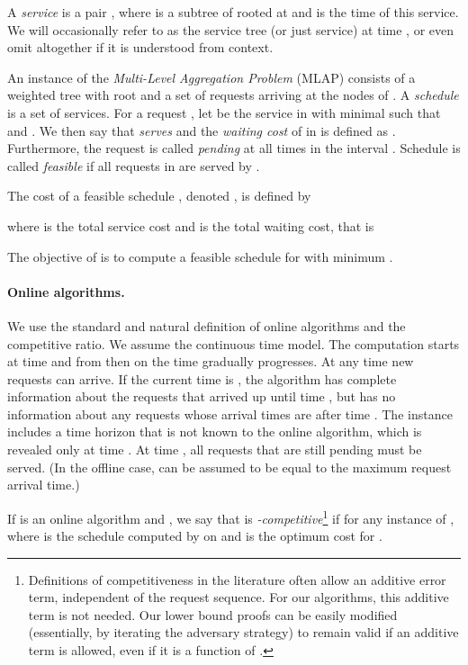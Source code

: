 \documentclass[a4paper]{article}
\newcommand{\MLAP}{\mbox{\rm\textsf{MLAP}}}
\begin{document}
A \emph{service} is a pair , where  is a subtree of 
rooted at  and  is the time of this service. We will
occasionally refer to  as the service tree (or just service) at
time , or even omit  altogether if it is understood from
context.

An instance  of the \emph{Multi-Level
Aggregation Problem} ({\MLAP}) consists of a weighted tree 
with root  and a set  of requests arriving at the nodes of
.  A \emph{schedule} is a set  of services. For a
request , let  be the service in  with minimal
 such that  and .  We then say
that  \emph{serves}  and the \emph{waiting cost} of
 in  is defined as
. Furthermore, the request 
is called \emph{pending} at all times in the interval .
Schedule  is called \emph{feasible} if all requests in
 are served by .

The cost of a feasible schedule , denoted , is
defined by

where  is the total service cost and  is the total waiting cost, that is

The objective of  is to compute a feasible schedule 
for  with minimum .


\paragraph{Online algorithms.}

We use the standard and natural definition of online algorithms and the competitive ratio. 
We assume the continuous time model. The computation starts at time  and from then on the
time gradually progresses. At any time  new requests can arrive. If the current time is
, the algorithm has complete information about the requests that arrived up until time ,
but has no information about any requests whose arrival times are after time .
The instance includes a time horizon  that is not known to the online algorithm, which
is revealed only at time . At time , all requests that are still pending must be served.
(In the offline case,  can be assumed to be equal to the maximum request arrival time.)

If  is an online algorithm and , we say that  is \emph{-competitive}\footnote{Definitions of competitiveness in the literature often
allow an additive error term, independent of the request sequence. 
For our algorithms, this additive term is not needed. Our lower bound proofs can be
easily modified (essentially, by iterating the adversary strategy) to remain valid
if an additive term is allowed, even if it is a function of .}
if  for any instance  of ,
where  is the schedule computed by  on  and  is the
optimum cost for .
\end{document}
